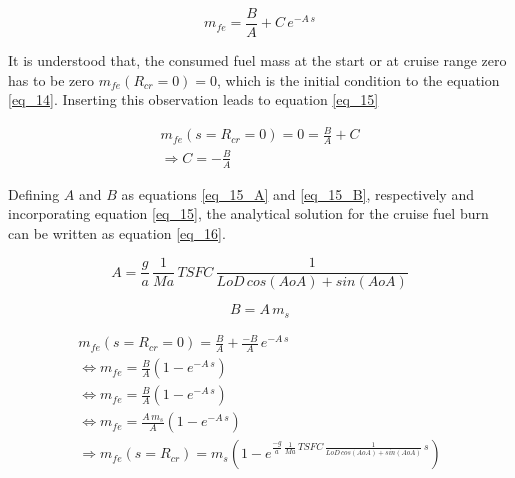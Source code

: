 \begin{equation}
    \label{eq_14}
    m_{fe} = \frac{B}{A} + C\, e^{-A\, s}
\end{equation}

It is understood that, the consumed fuel mass 
at the start or at cruise range zero 
has to be zero $m_{fe}(R_{cr} =0) = 0$, which 
is the initial condition to the equation \eqref{eq_14}. 
Inserting this observation leads to equation 
\eqref{eq_15}

\begin{equation}
    \label{eq_15}
    \begin{aligned}
        m_{fe}(s = R_{cr} =0) = 0 =  \frac{B}{A} + C\\
        \Rightarrow  C = - \frac{B}{A}
    \end{aligned}
\end{equation}

Defining $A$ and $B$ as equations \eqref{eq_15_A} and 
\eqref{eq_15_B}, respectively
and incorporating equation \eqref{eq_15}, the 
analytical solution for the cruise fuel burn can be 
written as equation \eqref{eq_16}. 

\begin{equation}
    \label{eq_15_A}
    A = \frac{g}{a} \, \frac{1}{Ma}\,TSFC \, \frac{1}{
        LoD \, cos(AoA) + sin(AoA)}
\end{equation}

\begin{equation}
    \label{eq_15_B}
    B = A \, m_s
\end{equation}



\begin{equation}
    \label{eq_16}
    \begin{aligned}
        m_{fe}(s = R_{cr} =0) = \frac{B}{A} + \frac{-B}{A}\, e^{-A\,s}\\
        \Leftrightarrow  m_{fe} = \frac{B}{A} (1-e^{-A\,s})\\
        \Leftrightarrow  m_{fe} = \frac{B}{A} (1-e^{-A\,s})\\
        \Leftrightarrow  m_{fe} = \frac{A \, m_s}{A} (1-e^{-A\,s})\\
        \Rightarrow m_{fe}(s = R_{cr}) =m_s \left(1-e^{\frac{-g}{a} \, 
            \frac{1}{Ma} \, TSFC \, 
            \frac{1}{LoD \,cos(AoA) + sin(AoA)} \, s} \right)
    \end{aligned}
\end{equation}

